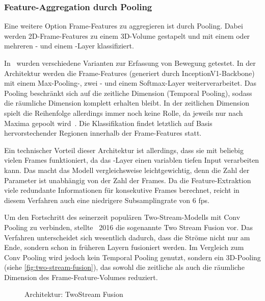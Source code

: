 \subsubsection{Feature-Aggregation durch Pooling}

Eine weitere Option Frame-Features zu aggregieren ist durch Pooling.
Dabei werden 2D-Frame-Features zu einem 3D-Volume gestapelt und mit einem oder mehreren \pool- und einem \fc-Layer klassifiziert.

In~\cite{Ng15} wurden verschiedene Varianten zur Erfassung von Bewegung getestet.
In der Architektur werden die Frame-Features (generiert durch InceptionV1-Backbone) mit einem Max-Pooling-, zwei \fc- und einem Softmax-Layer weiterverarbeitet.
Das Pooling beschränkt sich auf die zeitliche Dimension (Temporal Pooling), sodass die räumliche Dimension komplett erhalten bleibt.
In der zeitlichen Dimension spielt die Reihenfolge allerdings immer noch keine Rolle, da jeweils nur nach Maxima gepoolt wird~\cite{Carreira17}.
Die Klassifikation findet letztlich auf Basis hervorstechender Regionen innerhalb der Frame-Features statt.


Ein technischer Vorteil dieser Architektur ist allerdings, dass sie mit beliebig vielen Frames funktioniert, da das \pool-Layer einen variablen tiefen Input verarbeiten kann.
Das macht das Modell vergleichsweise leichtgewichtig, denn die Zahl der Parameter ist unabhängig von der Zahl der Frames.
Da die Feature-Extraktion viele redundante Informationen für konsekutive Frames berechnet, reicht in diesem Verfahren auch eine niedrigere Subsamplingrate von 6 \gls{fps}.


Um den Fortschritt des seinerzeit populären Two-Stream-Modells mit Conv Pooling zu verbinden, stellte~\cite{Feichtenhofer16} 2016 die sogenannte Two Stream Fusion vor.
Das Verfahren unterscheidet sich wesentlich dadurch, dass die Ströme nicht nur am Ende, sondern schon in früheren Layern fusioniert werden.
Im Vergleich zum Conv Pooling wird jedoch kein Temporal Pooling genutzt, sondern ein 3D-Pooling (siehe \autoref{fig:two-stream-fusion}), das sowohl die zeitliche als auch die räumliche Dimension des Frame-Feature-Volumes reduziert.

\begin{figure}[h!]
    \centering
    \caption{Architektur: TwoStream Fusion}
    \label{fig:two-stream-fusion}
\end{figure}

